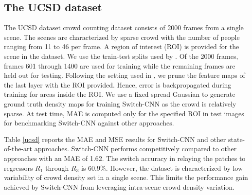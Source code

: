 \documentclass[10pt,twocolumn,letterpaper]{article}
\begin{document}
\begin{comment}
\begin{table}[!h]
\centering
\scalebox{0.78}{
\begin{tabular}{|c|c|c|c|c| c|}
\hline 
Method & MAE & MSE & Method & MAE & MSE\tabularnewline
\hline 
\hline 
Lempitsky et al.\cite{lempitsky2010learning} & 493.4 & 487.1 &MCNN~\cite{zhang2016single} & 377.6 & 509.1\tabularnewline
\hline 
Idrees et al.\cite{idrees2013multi} & 419.5 & 487.1 & Hydra2s~\cite{onoro2016towards} & 333.73  & \textbf{425.26} \tabularnewline
\hline 
Zhang et al.~\cite{zhang2015cross}  & 467.0 & 498.5& CrowdNet~\cite{boominathan2016crowdnet} & 452.5 & --\tabularnewline
\hline 
\textbf{Switch-CNN} & \textbf{318.1} & 439.2 & -- & -- & -- \tabularnewline
\hline 
\end{tabular}\medskip{}}

\vspace*{1.2mm}
\caption{Comparison of Switch-CNN with other state-of-the-art crowd counting methods on UCF\_CC\_50 dataset~\cite{idrees2013multi}.}
\label{ucf50}
\end{table}

\end{comment}


\subsection{The UCSD dataset}

The UCSD dataset crowd counting dataset consists of 2000 frames from a single scene. The scenes are characterized by sparse crowd with the number of people ranging from 11 to 46 per frame. A region of interest (ROI) is provided for the scene in the dataset. We use the train-test splits used by \cite{chan2008privacy}. Of the 2000 frames, frames 601 through 1400 are used for training while the remaining frames are held out for testing. Following the setting used in \cite{zhang2016single}, we prune the feature maps of the last layer with the ROI provided. Hence, error is backpropagated during training for areas inside the ROI. We use a fixed spread Gaussian to generate ground truth density maps for training Switch-CNN as the crowd is relatively sparse. At test time, MAE is computed only for the specified ROI in test images for benchmarking Switch-CNN against other approaches.

Table \ref{ucsd} reports the MAE and MSE results for Switch-CNN and other state-of-the-art approaches. Switch-CNN performs competitively compared to other approaches with an MAE of 1.62. The switch accuracy in relaying the patches to regressors $R_1$ through $R_3$ is 60.9\%. However, the dataset is characterized by low variability of crowd density set in a single scene. This limits the performance gain achieved by Switch-CNN from leveraging intra-scene crowd density variation.
\end{document}
